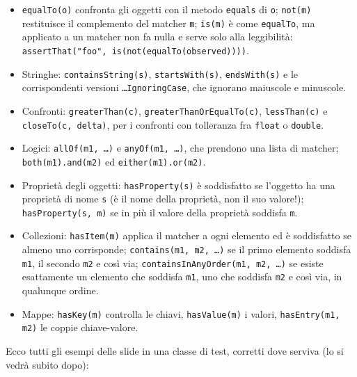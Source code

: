 \begin{itemize}
  \item \texttt{equalTo(o)} confronta gli oggetti con il metodo \texttt{equals} di \texttt{o}; \texttt{not(m)}
        restituisce il complemento del matcher \texttt{m}; \texttt{is(m)} è come \texttt{equalTo}, ma applicato a un
        matcher non fa nulla e serve solo alla leggibilità: \texttt{assertThat("foo", is(not(equalTo(observed))))}.
  \item Stringhe: \texttt{containsString(s)}, \texttt{startsWith(s)}, \texttt{endsWith(s)} e le corrispondenti versioni
        \texttt{\ldots IgnoringCase}, che ignorano maiuscole e minuscole.
  \item Confronti: \texttt{greaterThan(c)}, \texttt{greaterThanOrEqualTo(c)}, \texttt{lessThan(c)} e
        \texttt{closeTo(c, delta)}, per i confronti con tolleranza fra \texttt{float} o \texttt{double}.
  \item Logici: \texttt{allOf(m1, \ldots)} e \texttt{anyOf(m1, \ldots)}, che prendono una lista di matcher;
        \texttt{both(m1).and(m2)} ed \texttt{either(m1).or(m2)}.
  \item Proprietà degli oggetti: \texttt{hasProperty(s)} è soddisfatto se l'oggetto ha una proprietà di nome
        \texttt{s} (è il nome della proprietà, non il suo valore!); \texttt{hasProperty(s, m)} se in più il valore
        della proprietà soddisfa \texttt{m}.
  \item Collezioni: \texttt{hasItem(m)} applica il matcher a ogni elemento ed è soddisfatto se almeno uno corrisponde;
        \texttt{contains(m1, m2, \ldots)} se il primo elemento soddisfa \texttt{m1}, il secondo \texttt{m2} e così via;
        \texttt{containsInAnyOrder(m1, m2, \ldots)} se esiste esattamente un elemento che soddisfa \texttt{m1}, uno che
        soddisfa \texttt{m2} e così via, in qualunque ordine.
  \item Mappe: \texttt{hasKey(m)} controlla le chiavi, \texttt{hasValue(m)} i valori, \texttt{hasEntry(m1, m2)} le
        coppie chiave-valore.
\end{itemize}

Ecco tutti gli esempi delle slide in una classe di test, corretti dove serviva (lo si vedrà subito dopo):

